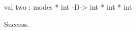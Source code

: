 \chklistingtrue
{}
\begin{ChkListingMsg}
val two : modes * int -D-> int * int * int 
\end{ChkListingMsg}
\begin{ChkListingErr}
Success.
\end{ChkListingErr}
